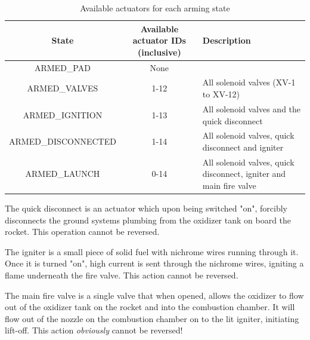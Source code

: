 \begin{table}[H]
    \centering
    \begin{tabular}{| c | c | p{2in} |}
        \hline
        State               & Available actuator IDs (inclusive) & Description                                        \\
        \hline
        ARMED\_PAD          & None                               &                                                    \\
        \hline
        ARMED\_VALVES       & 1-12                               & All solenoid valves (XV-1 to XV-12)                \\
        \hline
        ARMED\_IGNITION     & 1-13                               & All solenoid valves and the quick disconnect       \\
        \hline
        ARMED\_DISCONNECTED & 1-14                               & All solenoid valves, quick disconnect and igniter  \\
        \hline
        ARMED\_LAUNCH       & 0-14                               & All solenoid valves, quick disconnect, igniter and
        main fire valve                                                                                               \\
        \hline
    \end{tabular}
    \caption{Available actuators for each arming state}
    \label{tbl:available-actuators}
\end{table}

The quick disconnect is an actuator which upon being switched "on", forcibly disconnects the ground systems plumbing
from the oxidizer tank on board the rocket. This operation cannot be reversed.

The igniter is a small piece of solid fuel with nichrome wires running through it. Once it is turned "on", high current
is sent through the nichrome wires, igniting a flame underneath the fire valve. This action cannot be reversed.

The main fire valve is a single valve that when opened, allows the oxidizer to flow out of the oxidizer tank on the
rocket and into the combustion chamber. It will flow out of the nozzle on the combustion chamber on to the lit igniter,
initiating lift-off. This action \textit{obviously} cannot be reversed!
